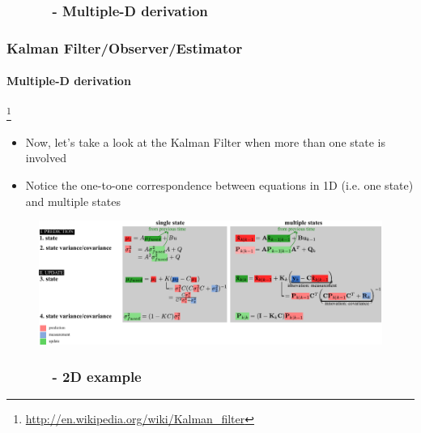 \subsubsection{\ \ \ \ \ \ - Multiple-D derivation}
\begin{frame}[plain]
\frametitle{Kalman Filter/Observer/Estimator}
\framesubtitle{Multiple-D derivation}

\footnote{\tiny\hspace{-0.23in} \hspace{-0.24in} \href{http://en.wikipedia.org/wiki/Kalman_filter}{http://en.wikipedia.org/wiki/Kalman\_filter}}
\begin{changemargin}{-1.4in}{0in}
\begin{itemize}\scriptsize
\item Now, let's take a look at the Kalman Filter when more than one state is involved
\item Notice the one-to-one correspondence between equations in 1D (i.e. one state) and multiple states
\end{itemize}
\begin{figure}[h]
\centering
\includegraphics[width=1.4\textwidth]{figs/TRK_KalmanFilter_equations-2D.pdf}
\end{figure}
\end{changemargin}
\end{frame}


\subsubsection{\ \ \ \ \ \ - 2D example}


